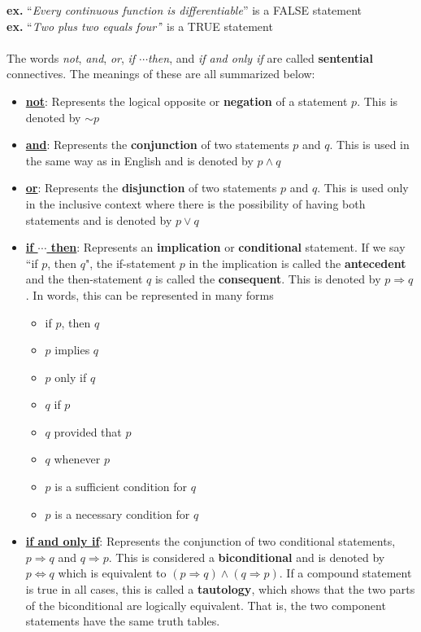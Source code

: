 \documentclass[11pt]{article}
\begin{document}
\textbf{ex. }``\textit{Every continuous function is differentiable}'' is a FALSE statement
 \\ \indent \textbf{ex.} ``\textit{Two plus two equals four'}' is a TRUE statement
 \\ \\ The words \textit{not}, \textit{and}, \textit{or}, \textit{if $\cdots$then}, and \textit{if and only if} are called \textbf{sentential} connectives. The meanings of these are all summarized below:
 \begin{itemize}
 \item \underline{\textbf{not}}: Represents the logical opposite or \textbf{negation} of a statement $p$. This is denoted by $ \sim p$ 
 \item \underline{\textbf{and}}: Represents the \textbf{conjunction} of two statements $p$ and $q$. This is used in the same way as in English and is denoted by $p \land q$
 \item \underline{\textbf{or}}: Represents the \textbf{disjunction} of two statements $p$ and $q$. This is used only in the inclusive context where there is the possibility of having both statements and is denoted by $p \lor q$
\item \underline{\textbf{if $\cdots$ then}}: Represents an \textbf{implication} or \textbf{conditional} statement.  If we say ``if $p$, then $q$", the if-statement $p$ in the implication is called the \textbf{antecedent} and the then-statement $q$ is called the \textbf{consequent}. This is denoted by $p \Rightarrow q$. In words, this can be represented in many forms 
\begin{multicols}{3}
\begin{itemize}
\item if $p$, then $q$
\item $p$ implies $q$
\item $p$ only if $q$
\item $q$ if $p$
\item $q$ provided that $p$
\item $q$ whenever $p$
\item $p$ is a sufficient condition for $q$
\item $p$ is a necessary condition for $q$
\end{itemize}
\end{multicols}
\item \underline{\textbf{if and only if}}: Represents the conjunction of two conditional statements, $p \Rightarrow q$ and $q \Rightarrow p$. This is considered a \textbf{biconditional} and is denoted by $ p \Leftrightarrow q$ which is equivalent to  $(p \Rightarrow q) \land (q \Rightarrow p)$. If a compound statement is true in all cases, this is called a \textbf{tautology}, which shows that the two parts of the biconditional are logically equivalent. That is, the two component statements have the same truth tables.
\end{itemize}
\end{document}
